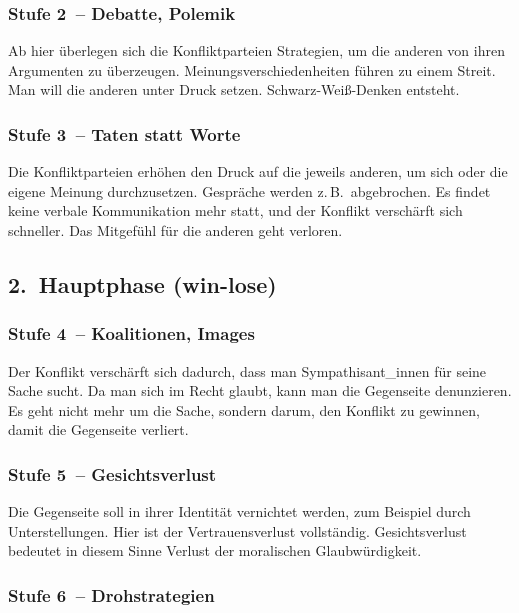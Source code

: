 \subsubsection{Stufe 2~-- Debatte, Polemik}

Ab hier überlegen sich die Konfliktparteien Strategien, um die anderen von ihren Argumenten zu überzeugen. Meinungsverschiedenheiten führen zu einem Streit. Man will die anderen unter Druck setzen. Schwarz-Weiß-Denken entsteht.

\subsubsection{Stufe 3~-- Taten statt Worte}

Die Konfliktparteien erhöhen den Druck auf die jeweils anderen, um sich oder die eigene Meinung durchzusetzen. Gespräche werden z.\,B.~abgebrochen. Es findet keine verbale Kommunikation mehr statt, und der Konflikt verschärft sich schneller. Das Mitgefühl für die \glqq anderen\grqq{} geht verloren.

\subsection{2.~Hauptphase (win-lose)}

\subsubsection{Stufe 4~-- Koalitionen, Images}

Der Konflikt verschärft sich dadurch, dass man Sympathisant\_innen für seine Sache sucht. Da man sich im Recht glaubt, kann man die Gegenseite denunzieren. Es geht nicht mehr um die Sache, sondern darum, den Konflikt zu gewinnen, damit die Gegenseite verliert.

\subsubsection{Stufe 5~-- Gesichtsverlust}

Die Gegenseite soll in ihrer Identität vernichtet werden, zum Beispiel durch Unterstellungen. Hier ist der Vertrauensverlust vollständig. Gesichtsverlust bedeutet in diesem Sinne Verlust der moralischen Glaubwürdigkeit.

\subsubsection{Stufe 6~-- Drohstrategien}

